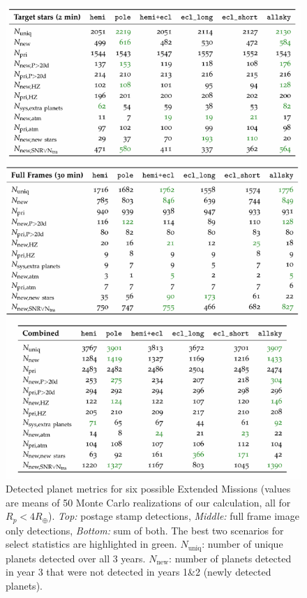 \begin{figure}[!t]
	\centering
	\includegraphics[scale=2.]{tables/160729_t50_with_earth_moon_Deming_corr_name_corr.pdf}
	\caption{Detected planet metrics for six possible Extended Missions (values are means of 50 Monte Carlo realizations of our calculation, all for $R_p<4R_\oplus$).
	\textit{Top:} postage stamp detections, \textit{Middle:} full frame image only detections, \textit{Bottom:} sum of both.
	The best two scenarios for select statistics are highlighted in green.
	\newline
	$N_\mathrm{uniq}$: number of unique planets detected over all 3 years.
	$N_\mathrm{new}$: number of planets detected in year 3 that were not detected in years 1\&2 (newly detected planets).
}
\end{figure}
